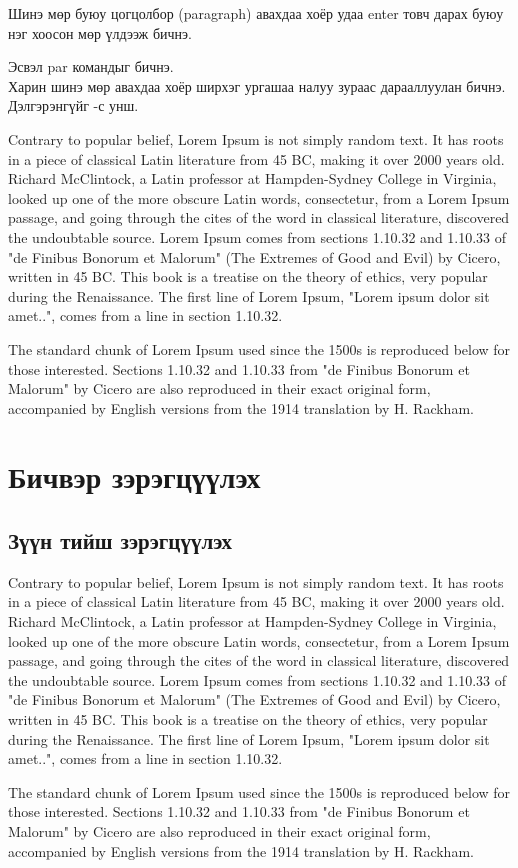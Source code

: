 \documentclass[12pt,A4]{report}
\begin{document}
Шинэ мөр буюу цогцолбор (paragraph) авахдаа хоёр удаа enter товч дарах буюу нэг хоосон мөр үлдээж бичнэ. \par Эсвэл par командыг бичнэ. 
\\Харин шинэ мөр авахдаа хоёр ширхэг ургашаа налуу зураас дарааллуулан бичнэ.  Дэлгэрэнгүйг \cite{pharagraph1}-с унш.

Contrary to popular belief, Lorem Ipsum is not simply random text. It has roots in a piece of classical Latin literature from 45 BC, making it over 2000 years old. Richard McClintock, a Latin professor at Hampden-Sydney College in Virginia, looked up one of the more obscure Latin words, consectetur, from a Lorem Ipsum passage, and going through the cites of the word in classical literature, discovered the undoubtable source. Lorem Ipsum comes from sections 1.10.32 and 1.10.33 of "de Finibus Bonorum et Malorum" (The Extremes of Good and Evil) by Cicero, written in 45 BC. This book is a treatise on the theory of ethics, very popular during the Renaissance. The first line of Lorem Ipsum, "Lorem ipsum dolor sit amet..", comes from a line in section 1.10.32.

The standard chunk of Lorem Ipsum used since the 1500s is reproduced below for those interested. Sections 1.10.32 and 1.10.33 from "de Finibus Bonorum et Malorum" by Cicero are also reproduced in their exact original form, accompanied by English versions from the 1914 translation by H. Rackham.

\section{Бичвэр зэрэгцүүлэх}
\subsection{Зүүн тийш зэрэгцүүлэх}
\begin{flushleft}
Contrary to popular belief, Lorem Ipsum is not simply random text. It has roots in a piece of classical Latin literature from 45 BC, making it over 2000 years old. Richard McClintock, a Latin professor at Hampden-Sydney College in Virginia, looked up one of the more obscure Latin words, consectetur, from a Lorem Ipsum passage, and going through the cites of the word in classical literature, discovered the undoubtable source. Lorem Ipsum comes from sections 1.10.32 and 1.10.33 of "de Finibus Bonorum et Malorum" (The Extremes of Good and Evil) by Cicero, written in 45 BC. This book is a treatise on the theory of ethics, very popular during the Renaissance. The first line of Lorem Ipsum, "Lorem ipsum dolor sit amet..", comes from a line in section 1.10.32.

The standard chunk of Lorem Ipsum used since the 1500s is reproduced below for those interested. Sections 1.10.32 and 1.10.33 from "de Finibus Bonorum et Malorum" by Cicero are also reproduced in their exact original form, accompanied by English versions from the 1914 translation by H. Rackham.
\end{flushleft}
\end{document}
